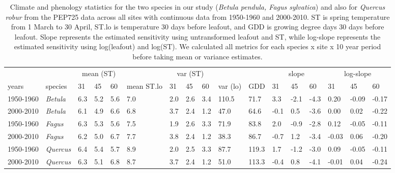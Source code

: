 \documentclass[11pt]{article}
\begin{document}
\begin{table}[ht]
\centering
\caption{Climate and phenology statistics for the two species in our study (\emph{Betula pendula, Fagus sylvatica}) and also for \emph{Quercus robur} from the PEP725 data across all sites with continuous data from 1950-1960 and 2000-2010. ST is spring temperature from 1 March to 30 April, ST.lo is temperature 30 days before leafout, and GDD is growing degree days 30 days before leafout. Slope represents the estimated sensitivity using untransformed leafout and ST, while log-slope represents the estimated sensitivity using log(leafout) and log(ST). We calculated all metrics for each species  x site x 10 year period before taking mean or variance estimates.} 
\label{tab:pep10yr}
\begingroup\footnotesize
\begin{tabular}{|p{}|p{}|p{}|p{}|p{}|p{}|p{}|p{}|p{}|p{}|p{}|p{}|p{}|p{}|p{}|p{}|p{}|}
  \hline
\multicolumn{1}{|c|}{} & \multicolumn{1}{|c|}{} & \multicolumn{3}{|c|}{mean (ST)} & \multicolumn{1}{|c|}{} & \multicolumn{3}{|c|}{var (ST)} & \multicolumn{1}{|c|}{} & \multicolumn{1}{|c|}{} & \multicolumn{3}{|c|}{slope} & \multicolumn{3}{|c|}{log-slope} \\  \cline{3-5} \cline{7-9} \cline{12-14} \cline{15-17}
  years & species & 31 & 45 & 60 & mean ST.lo & 31 & 45 & 60 & var (lo) & GDD & 31 & 45 & 60 & 31 & 45 & 60 \\ 
  \hline
1950-1960 & \emph{Betula} & 6.3 & 5.2 & 5.6 & 7.0 & 2.0 & 2.6 & 3.4 & 110.5 & 71.7 & 3.3 & -2.1 & -4.3 & 0.20 & -0.09 & -0.17 \\ 
  2000-2010 & \emph{Betula} & 6.1 & 4.9 & 6.6 & 6.8 & 3.7 & 2.4 & 1.2 & 47.0 & 64.6 & -0.1 & 0.5 & -3.6 & 0.00 & 0.02 & -0.22 \\ 
  1950-1960 & \emph{Fagus} & 6.3 & 5.3 & 5.6 & 7.5 & 1.9 & 2.6 & 3.3 & 71.9 & 83.8 & 2.0 & -0.9 & -2.8 & 0.12 & -0.05 & -0.11 \\ 
  2000-2010 & \emph{Fagus} & 6.2 & 5.0 & 6.7 & 7.7 & 3.8 & 2.4 & 1.2 & 38.3 & 86.7 & -0.7 & 1.2 & -3.4 & -0.03 & 0.06 & -0.20 \\ 
  1950-1960 & \emph{Quercus} & 6.4 & 5.4 & 5.7 & 8.9 & 2.0 & 2.5 & 3.3 & 87.7 & 119.3 & 1.7 & -1.2 & -3.0 & 0.09 & -0.05 & -0.11 \\ 
  2000-2010 & \emph{Quercus} & 6.3 & 5.1 & 6.8 & 8.7 & 3.7 & 2.4 & 1.2 & 51.0 & 113.3 & -0.4 & 0.8 & -4.1 & -0.01 & 0.04 & -0.24 \\ 
   \hline
\end{tabular}
\endgroup
\end{table}%
\end{document}
